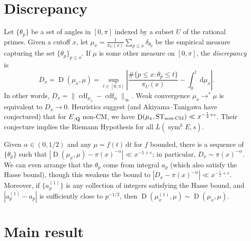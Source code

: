 \documentclass{article}
\DeclareMathOperator{\cdf}{cdf}
\DeclareMathOperator{\D}{D}
\DeclareMathOperator{\sym}{sym}
\newcommand{\bQ}{\mathbf{Q}}
\newcommand{\dd}{\mathrm{d}}
\newcommand{\nonCM}{\textnormal{non-CM}}
\newcommand{\ST}{\mathrm{ST}}
\begin{document}
\section{Discrepancy}

Let $\{\theta_p\}$ be a set of angles in $[0,\pi]$ indexed by a subset $U$ of 
the rational primes. Given a cutoff $x$, let 
$\mu_x = \frac{1}{\pi_U(x)}\sum_{p\leqslant x} \delta_{\theta_p}$ be the 
empirical measure capturing the set $\{\theta_p\}_{p\leqslant x}$. If $\mu$ is 
some other measure on $[0,\pi]$, the \emph{discrepancy} is 
\[
	D_x = \D(\mu_x,\mu) = \sup_{t\in [0,\pi]} \left| \frac{\#\{p\leqslant x : \theta_p \leqslant t\}}{\pi_U(x)} - \int_0^t \, \dd \mu_x\right| .
\]
In other words, $D_x = \|\cdf_{\mu_x} - \cdf_\mu\|_\infty$. Weak convergence 
$\mu_x \to^\ast \mu$ is equivalent to $D_x \to 0$. Heuristics suggest (and 
Akiyama--Tanigawa have conjectured) that for $E_{/\bQ}$ non-CM, we have 
$\D(\mu_x,\ST_\nonCM) \ll x^{-\frac 1 2+\epsilon}$. Their conjecture implies 
the Riemann Hypothesis for all $L(\sym^k E,s)$. 

Given $\alpha\in (0,1/2)$ and any $\mu = f(t)\, \dd t$ for $f$ bounded, there 
is a sequence of $\{\theta_p\}$ such that 
$|\D(\mu_x,\mu) - \pi(x)^{-\alpha}| \ll x^{-1+\epsilon}$; in particular, 
$D_x \sim \pi(x)^{-\alpha}$. We can even arrange that the $\theta_p$ come 
from integral $a_p$ (which also satisfy the Hasse bound), though this weakens 
the bound to $|D_x - \pi(x)^{-\alpha}| \ll x^{-\frac 1 2+\epsilon}$. Moreover, 
if $\{a_p^{(1)}\}$ is any collection of integers satisfying the Hasse bound, and 
$|a_p^{(1)} - a_p|$ is sufficiently close to $p^{-1/2}$, then 
$\D(\mu_x^{(1)},\mu) \sim \D(\mu_x,\mu)$. 





\section{Main result}
\end{document}
